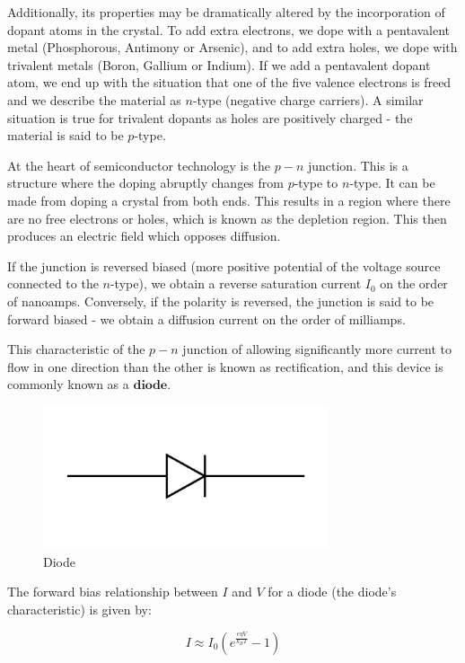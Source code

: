 \documentclass{article}
\begin{document}
Additionally, its properties may be dramatically altered by the incorporation of dopant atoms in the crystal. To add extra electrons, we dope with a pentavalent metal (Phosphorous, Antimony or Arsenic), and to add extra holes, we dope with trivalent metals (Boron, Gallium or Indium). If we add a pentavalent dopant atom, we end up with the situation that one of the five valence electrons is freed and we describe the material as $n$-type (negative charge carriers). A similar situation is true for trivalent dopants as holes are positively charged - the material is said to be $p$-type.

At the heart of semiconductor technology is the $p-n$ junction. This is a structure where the doping abruptly changes from $p$-type to $n$-type. It can be made from doping a crystal from both ends. This results in a region where there are no free electrons or holes, which is known as the depletion region. This then produces an electric field which opposes diffusion.

If the junction is reversed biased (more positive potential of the voltage source connected to the $n$-type), we obtain a reverse saturation current $I_0$ on the order of nanoamps. Conversely, if the polarity is reversed, the junction is said to be forward biased - we obtain a diffusion current on the order of milliamps.

This characteristic of the $p-n$ junction of allowing significantly more current to flow in one direction than the other is known as rectification, and this device is commonly known as a $\textbf{diode}$.

\begin{figure}[h]
    \centering
    \includegraphics[width=0.75\textwidth]{images/diode1.png}
    \caption{Diode}
    \label{fig:diode1}
\end{figure}

The forward bias relationship between $I$ and $V$ for a diode (the diode's characteristic) is given by:

\[ I \approx I_0\left(e^{\frac{e\eta V}{k_BT}} - 1\right) \]
\end{document}
